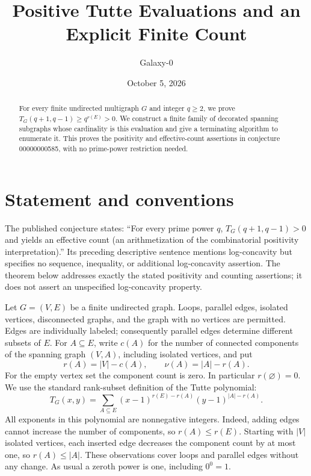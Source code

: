 \documentclass[11pt]{article}
\title{Positive Tutte Evaluations and an Explicit Finite Count}
\author{Galaxy-0}
\date{October 5, 2026}
\begin{document}
\maketitle
\begin{abstract}
For every finite undirected multigraph $G$ and integer $q\ge2$, we prove
$T_G(q+1,q-1)\ge q^{r(E)}>0$. We construct a finite family of decorated
spanning subgraphs whose cardinality is this evaluation and give a terminating
algorithm to enumerate it. This proves the positivity and effective-count
assertions in conjecture 00000000585, with no prime-power restriction needed.
\end{abstract}

\section{Statement and conventions}
The published conjecture states: ``For every prime power $q$,
$T_G(q+1,q-1)>0$ and yields an effective count (an arithmetization of the
combinatorial positivity interpretation).'' Its preceding descriptive sentence
mentions log-concavity but specifies no sequence, inequality, or additional
log-concavity assertion. The theorem below addresses exactly the stated
positivity and counting assertions; it does not assert an unspecified
log-concavity property.

Let $G=(V,E)$ be a finite undirected graph. Loops, parallel edges, isolated
vertices, disconnected graphs, and the graph with no vertices are permitted.
Edges are individually labeled; consequently parallel edges determine different
subsets of $E$. For $A\subseteq E$, write $c(A)$ for the number of connected
components of the spanning graph $(V,A)$, including isolated vertices, and put
\[
 r(A)=|V|-c(A),\qquad \nu(A)=|A|-r(A).
\]
For the empty vertex set the component count is zero. In particular
$r(\varnothing)=0$. We use the standard rank-subset definition of the Tutte
polynomial:
\begin{equation}\label{eq:tutte}
 T_G(x,y)=\sum_{A\subseteq E}
 (x-1)^{r(E)-r(A)}(y-1)^{|A|-r(A)}.
\end{equation}
All exponents in this polynomial are nonnegative integers. Indeed, adding
edges cannot increase the number of components, so $r(A)\le r(E)$. Starting
with $|V|$ isolated vertices, each inserted edge decreases the component count
by at most one, so $r(A)\le|A|$. These observations cover loops and parallel
edges without any change. As usual a zeroth power is one, including $0^0=1$.
\end{document}
